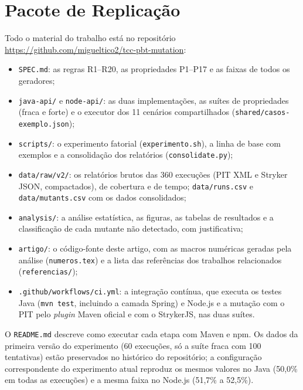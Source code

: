 \section{Pacote de Replicação}
\label{sec:replicacao}

Todo o material do trabalho está no repositório \url{https://github.com/migueltico2/tcc-pbt-mutation}:

{\sloppy
\begin{itemize}
  \item \texttt{SPEC.md}: as regras R1--R20, as propriedades P1--P17 e as faixas de todos os geradores;
  \item \texttt{java-api/} e \texttt{node-api/}: as duas implementações, as suítes de propriedades (fraca e forte) e o executor dos 11 cenários compartilhados (\texttt{shared/casos-exemplo.json});
  \item \texttt{scripts/}: o experimento fatorial (\texttt{experimento.sh}), a linha de base com exemplos e a consolidação dos relatórios (\texttt{consolidate.py});
  \item \texttt{data/raw/v2/}: os relatórios brutos das 360 execuções (PIT XML e Stryker JSON, compactados), de cobertura e de tempo; \texttt{data/runs.csv} e \texttt{data/mutants.csv} com os dados consolidados;
  \item \texttt{analysis/}: a análise estatística, as figuras, as tabelas de resultados e a classificação de cada mutante não detectado, com justificativa;
  \item \texttt{artigo/}: o código-fonte deste artigo, com as macros numéricas geradas pela análise (\texttt{numeros.tex}) e a lista das referências dos trabalhos relacionados (\texttt{referencias/});
  \item \texttt{.github/workflows/ci.yml}: a integração contínua, que executa os testes Java (\texttt{mvn test}, incluindo a camada Spring) e Node.js e a mutação com o PIT pelo \textit{plugin} Maven oficial e com o StrykerJS, nas duas suítes.
\end{itemize}
}

O \texttt{README.md} descreve como executar cada etapa com Maven e npm. Os dados da primeira versão do experimento (60 execuções, só a suíte fraca com 100 tentativas) estão preservados no histórico do repositório; a configuração correspondente do experimento atual reproduz os mesmos valores no Java (50,0\% em todas as execuções) e a mesma faixa no Node.js (51,7\% a 52,5\%).
